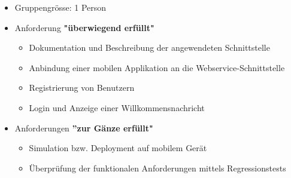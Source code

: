 \begin{itemize}
	\item Gruppengrösse: 1 Person
	\item Anforderung \textbf{"überwiegend erfüllt"}
	\begin{itemize}
		\item Dokumentation und Beschreibung der angewendeten Schnittstelle
		\item Anbindung einer mobilen Applikation an die Webservice-Schnittstelle
		\item Registrierung von Benutzern
		\item Login und Anzeige einer Willkommensnachricht
	\end{itemize}
	\item Anforderungen \textbf{''zur Gänze erfüllt"}
	\begin{itemize}
		\item Simulation bzw. Deployment auf mobilem Gerät
		\item Überprüfung der funktionalen Anforderungen mittels Regressionstests
	\end{itemize}
\end{itemize}
